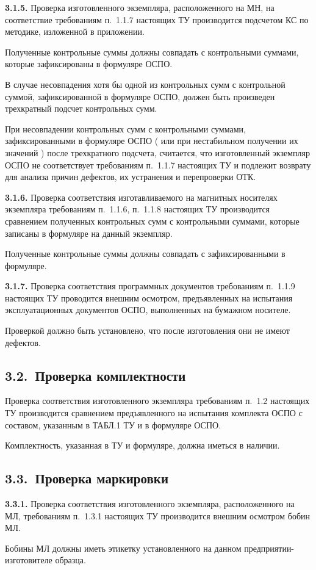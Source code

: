 \documentclass[11pt,a4paper]{article}
\begin{document}
\par\textbf{3.1.5.} Проверка изготовленного экземпляра, расположенного на МН, на соответствие требованиям п.~1.1.7 настоящих ТУ производится подсчетом КС по методике, изложенной в приложении.\par
Полученные контрольные суммы должны совпадать с контрольными суммами, которые зафиксированы в формуляре ОСПО.

В случае несовпадения хотя бы одной из контрольных сумм с контрольной суммой, зафиксированной в формуляре ОСПО, должен быть произведен трехкратный подсчет контрольных сумм.

При несовпадении контрольных сумм с контрольными суммами, зафиксированными в формуляре ОСПО ( или при нестабильном получении их значений ) после трехкратного подсчета, считается, что изготовленный экземпляр ОСПО не соответствует требованиям п.~1.1.7 настоящих ТУ и подлежит возврату для анализа причин дефектов, их устранения и перепроверки ОТК.

\par\textbf{3.1.6.} Проверка соответствия изготавливаемого на магнитных носителях экземпляра требованиям п.~1.1.6, п.~1.1.8 настоящих ТУ производится сравнением полученных контрольных сумм с контрольными суммами, которые записаны в формуляре на данный экземпляр.\par
Полученные контрольные суммы должны совпадать с зафиксированными в формуляре.

\par\textbf{3.1.7.} Проверка соответствия программных документов требованиям п.~1.1.9 настоящих ТУ проводится внешним осмотром, предъявленных на испытания эксплуатационных документов ОСПО, выполненных на бумажном носителе.\par
Проверкой должно быть установлено, что после изготовления они не имеют дефектов.

\subsection*{3.2.~Проверка комплектности}
Проверка соответствия изготовленного экземпляра требованиям п.~1.2 настоящих ТУ производится сравнением предъявленного на испытания комплекта ОСПО с составом, указанным в ТАБЛ.1 ТУ и в формуляре ОСПО.

Комплектность, указанная в ТУ и формуляре, должна иметься в наличии.

\subsection*{3.3.~Проверка маркировки}
\par\textbf{3.3.1.} Проверка соответствия изготовленного экземпляра, расположенного на МЛ, требованиям п.~1.3.1 настоящих ТУ производится внешним осмотром бобин МЛ.\par
Бобины МЛ должны иметь этикетку установленного на данном предприятии-изготовителе образца.
\end{document}
